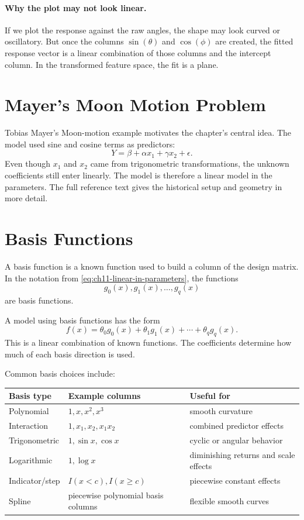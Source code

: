 {\paragraph{Why the plot may not look linear.}
If we plot the response against the raw angles, the shape may look curved or oscillatory.  But once the columns \(\sin(\theta)\) and \(\cos(\phi)\) are created, the fitted response vector is a linear combination of those columns and the intercept column.  In the transformed feature space, the fit is a plane.
}{
\section{Mayer's Moon Motion Problem}

Tobias Mayer's Moon-motion example motivates the chapter's central idea.  The model used sine and cosine terms as predictors:
\begin{equation}
  Y=\beta+\alpha x_1+\gamma x_2+\epsilon.
\end{equation}
Even though \(x_1\) and \(x_2\) came from trigonometric transformations, the unknown coefficients still enter linearly.  The model is therefore a linear model in the parameters.  The full reference text gives the historical setup and geometry in more detail.
}
\section{Basis Functions}

A basis function is a known function used to build a column of the design matrix.  In the notation from \eqref{eq:ch11-linear-in-parameters}, the functions
\begin{equation}
  g_0(x),g_1(x),\ldots,g_q(x)
\end{equation}
are basis functions.

A model using basis functions has the form
\begin{equation}
  f(x)=\theta_0g_0(x)+\theta_1g_1(x)+\cdots+\theta_qg_q(x).
\end{equation}
This is a linear combination of known functions.  The coefficients determine how much of each basis direction is used.

Common basis choices include:
\begin{center}
\begin{tabular}{lll}
\toprule
Basis type & Example columns & Useful for \\
\midrule
Polynomial & \(1,x,x^2,x^3\) & smooth curvature \\
Interaction & \(1,x_1,x_2,x_1x_2\) & combined predictor effects \\
Trigonometric & \(1,\sin x,\cos x\) & cyclic or angular behavior \\
Logarithmic & \(1,\log x\) & diminishing returns and scale effects \\
Indicator/step & \(I(x<c), I(x\ge c)\) & piecewise constant effects \\
Spline & piecewise polynomial basis columns & flexible smooth curves \\
\bottomrule
\end{tabular}
\end{center}

